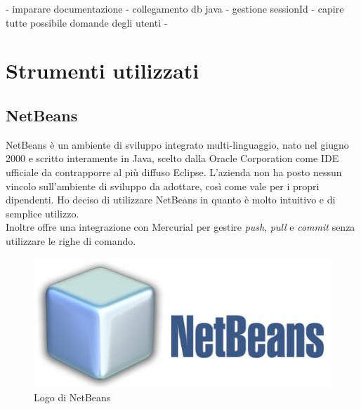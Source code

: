 - imparare documentazione
- collegamento db java
- gestione sessionId
- capire tutte possibile domande degli utenti
- 


\section{Strumenti utilizzati}
\subsection{NetBeans}
NetBeans è un ambiente di sviluppo integrato multi-linguaggio, nato nel giugno 2000 e scritto interamente in Java, scelto dalla Oracle Corporation come IDE ufficiale da contrapporre al più diffuso Eclipse.
L'azienda non ha posto nessun vincolo sull'ambiente di sviluppo da adottare, così come vale per i propri dipendenti. Ho deciso di utilizzare NetBeans in quanto è molto intuitivo e di semplice utilizzo.\\
Inoltre offre una integrazione con \gls{Mercurial} per gestire \emph{push}, \emph{pull} e \emph{commit} senza utilizzare le righe di comando.
\begin{figure}[h]
	\centering
	\includegraphics[scale=0.4]{../Immagini/netbeans.jpg}
	\caption{Logo di NetBeans}
\end{figure}
